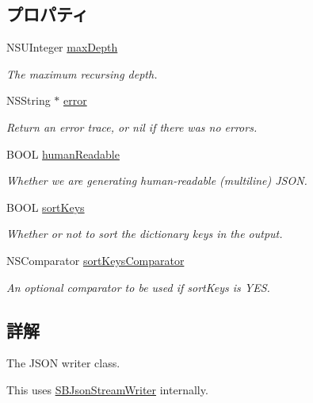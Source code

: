 \subsection*{プロパティ}
\begin{DoxyCompactItemize}
\item 
N\+S\+U\+Integer \hyperlink{interface_s_b_json_writer_a283b4f65ab4d3e1a8112b37dea432689}{max\+Depth}
\begin{DoxyCompactList}\small\item\em The maximum recursing depth. \end{DoxyCompactList}\item 
N\+S\+String $\ast$ \hyperlink{interface_s_b_json_writer_abc3f1e7299df08c56837d6c8ad135421}{error}
\begin{DoxyCompactList}\small\item\em Return an error trace, or nil if there was no errors. \end{DoxyCompactList}\item 
B\+O\+O\+L \hyperlink{interface_s_b_json_writer_a16ca84860a2ee76a03b567dc5181a851}{human\+Readable}
\begin{DoxyCompactList}\small\item\em Whether we are generating human-\/readable (multiline) J\+S\+O\+N. \end{DoxyCompactList}\item 
B\+O\+O\+L \hyperlink{interface_s_b_json_writer_af25807a58a322b56cb5d3593532228e5}{sort\+Keys}
\begin{DoxyCompactList}\small\item\em Whether or not to sort the dictionary keys in the output. \end{DoxyCompactList}\item 
N\+S\+Comparator \hyperlink{interface_s_b_json_writer_ae1fb01a8ddff3f7825917ee2291bc5cb}{sort\+Keys\+Comparator}
\begin{DoxyCompactList}\small\item\em An optional comparator to be used if sort\+Keys is Y\+E\+S. \end{DoxyCompactList}\end{DoxyCompactItemize}


\subsection{詳解}
The J\+S\+O\+N writer class. 

This uses \hyperlink{interface_s_b_json_stream_writer}{S\+B\+Json\+Stream\+Writer} internally.

